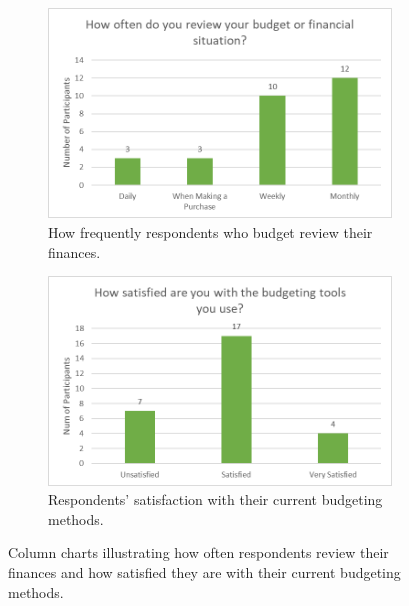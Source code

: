 \documentclass{l4proj}
\begin{document}
\begin{appendices}
\begin{figure}[htb] 
    \centering
    \begin{subfigure}[b]{0.45\textwidth}
        \centering
        \includegraphics[width=\linewidth]{images/User-Survey/user-survey-charts-budgeting-periods.png}
        \caption{How frequently respondents who budget review their finances.}
        \label{fig:budgeting-periods}
    \end{subfigure}
    \begin{subfigure}[b]{0.45\textwidth}
        \centering
        \includegraphics[width=\linewidth]{images/User-Survey/user-survey-charts-sats-tools.png}
        \caption{Respondents’ satisfaction with their current budgeting methods.}
        \label{fig:sats-tools}
    \end{subfigure}
    \caption{Column charts illustrating how often respondents review their finances and how satisfied they are with their current budgeting methods.}
    \label{fig:comf-devices-charts}
\end{figure}


\end{appendices}
\end{document}
